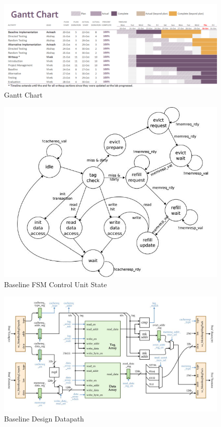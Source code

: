 \documentclass[10pt]{article}
\begin{document}
\begin{figure}[b]
\centering
\includegraphics[scale=0.5, angle=90]{gantt}
\caption{Gantt Chart}
\label{fig:gantt}
\end{figure}


\begin{figure}[b]
\centering
\includegraphics[scale=0.8]{state}
\caption{Baseline FSM Control Unit State}
\label{fig:state}
\end{figure}


\begin{figure}[b]
\centering
\includegraphics[scale=0.6]{baseline}
\caption{Baseline Design Datapath}
\label{fig:baseline}
\end{figure}
\end{document}
